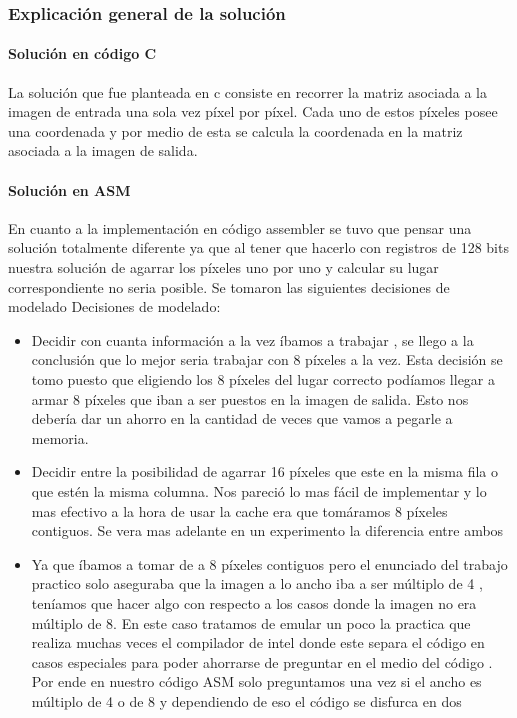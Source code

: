 \subsubsection*{Explicación general de la solución}
\paragraph{Solución en código C}
La solución que fue planteada en c consiste en recorrer la matriz asociada a la imagen de entrada una sola vez píxel por píxel. Cada uno de estos píxeles posee una coordenada y por medio de esta se calcula la coordenada en la matriz asociada a la imagen de salida. 


\paragraph{Solución en ASM}
En cuanto a la implementación en código assembler se tuvo que pensar una solución totalmente diferente ya que al tener que hacerlo con registros de 128 bits nuestra solución de agarrar los píxeles uno por uno y calcular su lugar correspondiente no seria posible. Se tomaron las siguientes decisiones de modelado Decisiones de modelado:
\begin{itemize}
\item Decidir con cuanta información a la vez íbamos a trabajar , se llego a la conclusión que lo mejor seria trabajar con 8 píxeles a la vez. Esta decisión se tomo puesto que eligiendo los 8 píxeles del lugar correcto podíamos llegar a armar 8 píxeles que iban a ser puestos en la imagen de salida. Esto nos debería dar un ahorro en la cantidad de veces que vamos a pegarle a memoria.
\item Decidir entre la posibilidad de agarrar 16 píxeles que este en la misma fila o que estén la misma columna. Nos pareció lo mas fácil de implementar y lo mas efectivo a la hora de usar la cache era que tomáramos 8 píxeles contiguos. Se vera mas adelante en un experimento la diferencia entre ambos
\item Ya que íbamos a tomar de a 8 píxeles contiguos pero el enunciado del trabajo practico solo aseguraba que la imagen a lo ancho iba a ser múltiplo de 4 , teníamos que hacer algo con respecto a los casos donde la imagen no era múltiplo de 8. En este caso tratamos de emular un poco la practica que realiza muchas veces el compilador de intel donde este separa el código en casos especiales para poder ahorrarse de preguntar en el medio del código . Por ende en nuestro código ASM solo preguntamos una vez si el ancho es múltiplo de 4 o de 8 y dependiendo de eso el código se disfurca en dos
\end{itemize}

